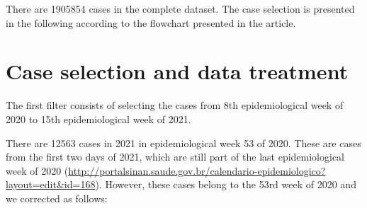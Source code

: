 \documentclass[
]{article}
\newenvironment{Shaded}{\begin{snugshade}}{\end{snugshade}}
\newcommand{\CommentTok}[1]{\textcolor[rgb]{0.56,0.35,0.01}{\textit{#1}}}
\newcommand{\DataTypeTok}[1]{\textcolor[rgb]{0.13,0.29,0.53}{#1}}
\newcommand{\DecValTok}[1]{\textcolor[rgb]{0.00,0.00,0.81}{#1}}
\newcommand{\KeywordTok}[1]{\textcolor[rgb]{0.13,0.29,0.53}{\textbf{#1}}}
\newcommand{\NormalTok}[1]{#1}
\newcommand{\OperatorTok}[1]{\textcolor[rgb]{0.81,0.36,0.00}{\textbf{#1}}}
\newcommand{\StringTok}[1]{\textcolor[rgb]{0.31,0.60,0.02}{#1}}
\begin{document}
There are 1905854 cases in the complete dataset. The case selection is
presented in the following according to the flowchart presented in the
article.

\hypertarget{case-selection-and-data-treatment}{%
\section{Case selection and data
treatment}\label{case-selection-and-data-treatment}}

The first filter consists of selecting the cases from 8th
epidemiological week of 2020 to 15th epidemiological week of 2021.

\begin{Shaded}
\end{Shaded}

There are 12563 cases in 2021 in epidemiological week 53 of 2020. These
are cases from the first two days of 2021, which are still part of the
last epidemiological week of 2020
(\url{http://portalsinan.saude.gov.br/calendario-epidemiologico?layout=edit\&id=168}).
However, these cases belong to the 53rd week of 2020 and we corrected as
follows:

\begin{Shaded}
\end{Shaded}
\end{document}
